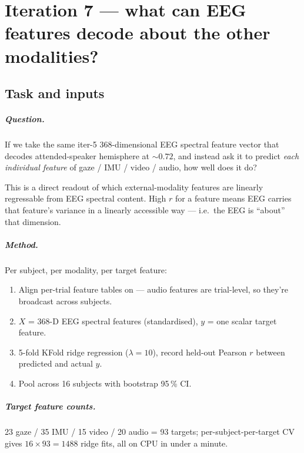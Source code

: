 \chapter{Iteration 7 --- what can EEG features decode about the other modalities?}
\label{ch:iter7}

\section{Task and inputs}

\paragraph{Question.} If we take the same iter-5 368-dimensional EEG
spectral feature vector that decodes attended-speaker hemisphere at
$\sim 0.72$, and instead ask it to predict \emph{each individual
feature} of gaze / IMU / video / audio, how well does it do?

This is a direct readout of which external-modality features are
linearly regressable from EEG spectral content. High $r$ for a feature
means EEG carries that feature's variance in a linearly accessible way
--- i.e.\ the EEG is ``about'' that dimension.

\paragraph{Method.} Per subject, per modality, per target feature:
\begin{enumerate}
  \item Align per-trial feature tables on  ---
        audio features are trial-level, so they're broadcast across
        subjects.
  \item $X$ = 368-D EEG spectral features (standardised), $y$ = one
        scalar target feature.
  \item 5-fold KFold ridge regression ($\lambda = 10$), record
        held-out Pearson $r$ between predicted and actual $y$.
  \item Pool across 16 subjects with bootstrap 95\,\% CI.
\end{enumerate}

\paragraph{Target feature counts.}
23 gaze / 35 IMU / 15 video / 20 audio = 93 targets; per-subject-per-target
CV gives $16 \times 93 = 1488$ ridge fits, all on CPU in under a minute.

